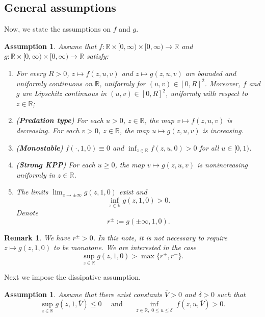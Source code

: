 \documentclass[10pt]{article}
\numberwithin{equation}{section}
\newcommand{\R}{\mathbb{R}}
\newtheorem{assumption}[theorem]{Assumption}
\newtheorem{remark}[theorem]{Remark}
\begin{document}
\subsection{General assumptions}
Now, we  state the  assumptions on $f$ and $g$.
\begin{assumption}\label{Ass-fg}
Assume that $f: \R \times [0, \infty)\times  [0, \infty) \to \R$ and $g: \R \times [0, \infty)\times  [0, \infty) \to \R$   satisfy: 
\begin{enumerate}
\item[(i)]  For every $R>0$,  $z \mapsto f(z,u,v)$ and $z \mapsto g(z,u,v )$ are bounded and uniformly continuous on $\R$, uniformly for $(u,v) \in [0, R]^2$.  Moreover,   $f$ and  $g $ are Lipschitz continuous in $(u,v)\in [0,R]^2$,  uniformly  with respect to $z\in \R$;
\item [(ii)]  (\textbf{Predation type}) For each $u>0$, $z\in \R$, the  map  $v\mapsto f(z,u, v)$ is decreasing. For each $v>0$,  $z\in \R$, the map $u\mapsto g(z,u,v)$  is increasing.
\item[(iii)] (\textbf{Monostable}) $f(\cdot, 1,0) \equiv 0$ and $\inf_{z\in \R} f(z,u, 0)> 0$ for all $u\in [0, 1)$. 
\item [(iv)] (\textbf{Strong KPP}) For each $u\geq 0$,  the map  $v \mapsto g(z, u, v)$ is nonincreasing uniformly in $z\in \R$.  
\item [(v)] The limits $\lim_{z\to \pm \infty} g(z, 1,0 )$ exist  and 
$$\inf_{z\in \R} g(z, 1, 0) >0. $$
 Denote
\begin{equation}\label{rrr}
r^{\pm} := g(\pm \infty , 1, 0).
\end{equation}

\end{enumerate}
\end{assumption}
\begin{remark}
\rm 
We have  $r^\pm >0$.  In this  note,  it is not necessary to  require $z\mapsto g(z, 1,0)$ to be monotone. We are interested in the case 
$$\sup_{z\in\R} g(z,1,0) > \max\{ r^+, r^- \}. $$
\end{remark}

\vspace{1em}

Next  we impose the  dissipative assumption. 
\begin{assumption} \label{Ass-bound}
Assume that there exist constants $\overline{V}>0$  and $\delta>0$ such that
$$  \sup_{z\in\R} g(z,1,\overline{V})\leq 0   \quad
\text{ and  } \quad
\inf_{\substack{z\in \R, \; 0\leq u\leq \delta}} f(z,u, \overline {V})> 0.
$$
\end{assumption}
\end{document}
